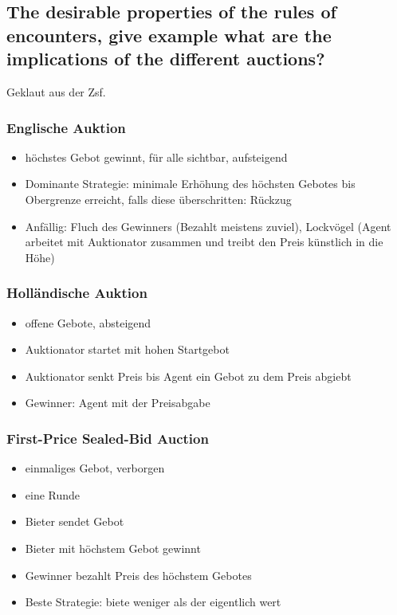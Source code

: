 \subsection{The desirable properties of the rules of encounters, give example what are the implications of the different auctions?}
Geklaut aus der Zsf.
\begin{multicols}{2}
\subsubsection{Englische Auktion}
\begin{itemize}
	\item höchstes Gebot gewinnt, für alle sichtbar, aufsteigend
	\item Dominante Strategie: minimale Erhöhung des höchsten Gebotes bis Obergrenze erreicht, falls diese überschritten: Rückzug
	\item Anfällig: Fluch des Gewinners (Bezahlt meistens zuviel), Lockvögel (Agent arbeitet mit Auktionator zusammen und treibt den Preis künstlich in die Höhe)
\end{itemize}
\subsubsection{Holländische Auktion}
\begin{itemize}
	\item offene Gebote, absteigend
	\item Auktionator startet mit hohen Startgebot
	\item Auktionator senkt Preis bis Agent ein Gebot zu dem Preis abgiebt
	\item Gewinner: Agent mit der Preisabgabe
\end{itemize}
\subsubsection{First-Price Sealed-Bid Auction}
\begin{itemize}
	\item einmaliges Gebot, verborgen
	\item eine Runde
	\item Bieter sendet Gebot
	\item Bieter mit höchstem Gebot gewinnt
	\item Gewinner bezahlt Preis des höchstem Gebotes
	\item Beste Strategie: biete weniger als der eigentlich wert
\end{itemize}

\end{multicols}
